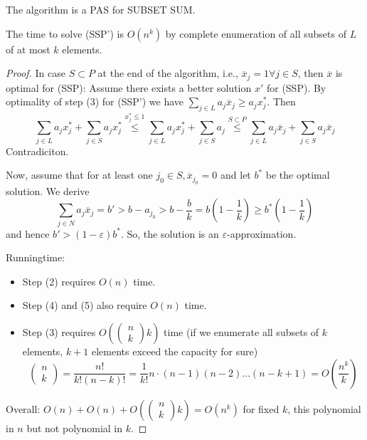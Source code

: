 \begin{thm}
The algorithm is a PAS for SUBSET SUM.

The time to solve (SSP') is $O(n^k)$ by complete enumeration of all subsets of $L$ of at most $k$ elements.
\end{thm}
\begin{proof}
In case $S \subset P$ at the end of the algorithm, i.e., $\overline x_j=1 \forall j \in S$, then $\overline x$ is optimal for (SSP): Assume there exists a better solution $x'$ for (SSP). By optimality of step (3) for (SSP') we have $\sum_{j \in L} a_j \overline x_j \geq a_j x^*_j$. Then
\[
  \sum_{j \in L} a_j x^*_j + \sum_{j \in S} a_j x^*_j \overset{x_j^* \leq 1}{\leq} \sum_{j \in L} a_j x^*_j+\sum_{j \in S} a_j \overset{S \subset P}{\leq} \sum_{j \in L} a_j \overline x_j + \sum_{j \in S} a_j \overline x_j
\]
Contradiciton.

Now, assume that for at least one $j_0 \in S, \overline x_{j_0}=0$ and let $b^*$ be the optimal solution. We derive
\[
  \sum_{j \in N} a_j \overline x_j =b' > b-a_{j_0} >b - \frac bk = b(1-\frac 1k) \geq b^*(1-\frac1k)
\]
and hence $b' > (1- \varepsilon)b^*$. So, the solution is an $\varepsilon$-approximation.

Runningtime:
\begin{itemize}
\item Step (2) requires $O(n)$ time.
\item Step (4) and (5) also require $O(n)$ time.
\item Step (3) requires $O(\begin{pmatrix} n \\ k \end{pmatrix} k)$ time (if we enumerate all subsets of $k$ elements, $k+1$ elements exceed the capacity for sure)
\[
  \begin{pmatrix} n \\ k \end{pmatrix} = \frac{n!}{k!(n-k)!}=\frac 1 {k!} n \cdot (n-1) (n-2) \dots (n-k+1) = O(\frac {n^k}k)
\]
\end{itemize}

Overall: $O(n)+O(n)+O(\begin{pmatrix} n \\ k \end{pmatrix} k)=O(n^k)$ for fixed $k$, this polynomial in $n$ but not polynomial in $k$.

\end{proof}